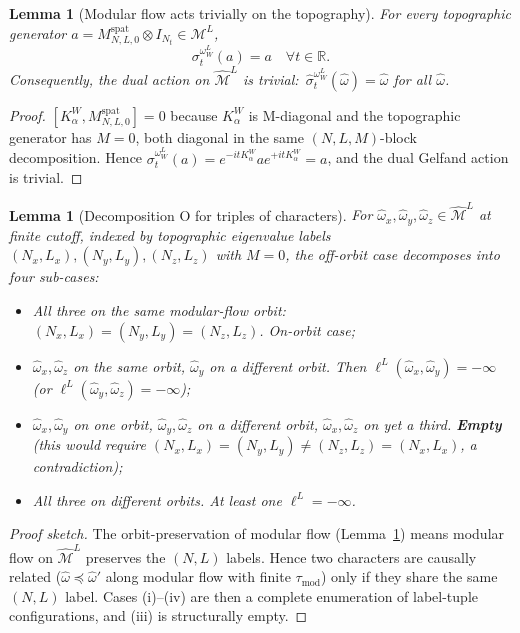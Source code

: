 \documentclass[11pt,a4paper]{article}
\theoremstyle{plain}
\newtheorem{lemma}[theorem]{Lemma}
\theoremstyle{definition}
\newcommand{\Nt}{N_{t}}
\newcommand{\Mcal}{\mathcal{M}}
\newcommand{\R}{\mathbb{R}}
\newcommand{\spat}{\mathrm{spat}}
\newcommand{\BWvac}{\omega_{W}^{L}}
\newcommand{\Kalpha}{K_{\alpha}^{W}}
\newcommand{\tmod}{\tau_{\mathrm{mod}}}
\begin{document}
\begin{lemma}[Modular flow acts trivially on the
topography]\label{lem:trivial_modular_action_on_topography}
For every topographic generator $a = M^{\spat}_{N, L, 0} \otimes I_{\Nt}
\in \Mcal^{L}$,
\[
\sigma_{t}^{\BWvac}(a) = a \quad \forall t \in \R.
\]
Consequently, the dual action on $\hat{\Mcal}^{L}$ is trivial:\
$\hat{\sigma}_{t}^{\BWvac}(\hat{\omega}) = \hat{\omega}$ for all
$\hat{\omega}$.
\end{lemma}

\begin{proof}
$[\Kalpha, M^{\spat}_{N, L, 0}] = 0$ because $\Kalpha$ is M-diagonal
and the topographic generator has $M = 0$, both diagonal in the same
$(N, L, M)$-block decomposition. Hence $\sigma_{t}^{\BWvac}(a) =
e^{-it\Kalpha} a e^{+it\Kalpha} = a$, and the dual Gelfand action is
trivial.
\end{proof}

\begin{lemma}[Decomposition O for triples of
characters]\label{lem:decomposition_o}
For $\hat{\omega}_{x}, \hat{\omega}_{y}, \hat{\omega}_{z} \in
\hat{\Mcal}^{L}$ at finite cutoff, indexed by topographic eigenvalue
labels $(N_{x}, L_{x}), (N_{y}, L_{y}), (N_{z}, L_{z})$ with $M = 0$,
the off-orbit case decomposes into four sub-cases:
\begin{itemize}
\item[(i)] All three on the same modular-flow orbit:\
$(N_{x}, L_{x}) = (N_{y}, L_{y}) = (N_{z}, L_{z})$. On-orbit case;
\item[(ii)] $\hat{\omega}_{x}, \hat{\omega}_{z}$ on the same orbit,
$\hat{\omega}_{y}$ on a different orbit. Then
$\ell^{L}(\hat{\omega}_{x}, \hat{\omega}_{y}) = -\infty$ (or
$\ell^{L}(\hat{\omega}_{y}, \hat{\omega}_{z}) = -\infty$);
\item[(iii)] $\hat{\omega}_{x}, \hat{\omega}_{y}$ on one orbit,
$\hat{\omega}_{y}, \hat{\omega}_{z}$ on a different orbit,
$\hat{\omega}_{x}, \hat{\omega}_{z}$ on yet a third. \textbf{Empty}
(this would require $(N_{x}, L_{x}) = (N_{y}, L_{y}) \ne
(N_{z}, L_{z}) = (N_{x}, L_{x})$, a contradiction);
\item[(iv)] All three on different orbits. At least one
$\ell^{L} = -\infty$.
\end{itemize}
\end{lemma}

\begin{proof}[Proof sketch]
The orbit-preservation of modular flow (Lemma~\ref{lem:trivial_modular_action_on_topography})
means modular flow on $\hat{\Mcal}^{L}$ preserves the $(N, L)$ labels.
Hence two characters are causally related ($\hat{\omega} \preceq
\hat{\omega}'$ along modular flow with finite $\tmod$) only if they
share the same $(N, L)$ label. Cases (i)--(iv) are then a complete
enumeration of label-tuple configurations, and (iii) is structurally
empty.
\end{proof}
\end{document}
